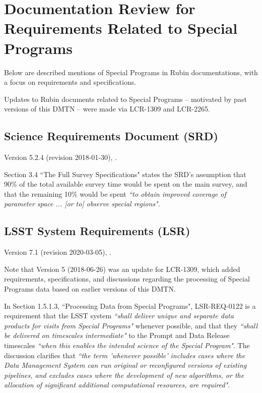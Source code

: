 \section{Documentation Review for Requirements Related to Special Programs}\label{sec:docrev}

Below are described mentions of Special Programs in Rubin documentations, with a focus on requirements and specifications.

Updates to Rubin documents related to Special Programs -- motivated by past versions of this DMTN -- were made via LCR-1309 and LCR-2265. 



\subsection{Science Requirements Document (SRD)}

Version 5.2.4 (revision 2018-01-30), .

Section 3.4 ``The Full Survey Specifications" states the SRD's assumption that 90\% of the total available survey time would be spent on the main survey, and that the remaining 10\% would be spent {\it ``to obtain improved coverage of parameter space ... [or to] observe special regions"}.



\subsection{LSST System Requirements (LSR)}

Version 7.1 (revision 2020-03-05), .

Note that Version 5 (2018-06-26) was an update for LCR-1309, which added requirements, specifications, and discussions regarding the processing of Special Programs data based on earlier versions of this DMTN.

In Section 1.5.1.3, ``Processing Data from Special Programs", LSR-REQ-0122 is a requirement that the LSST system {\it ``shall deliver unique and separate data products for visits from Special Programs"} whenever possible, and that they {\it ``shall be delivered on timescales intermediate"} to the Prompt and Data Release timescales {\it ``when this enables the intended science of the Special Program"}.
The discussion clarifies that {\it ``the term 'whenever possible' includes cases where the Data Management System can run original or reconfigured versions of existing pipelines, and excludes cases where the development of new algorithms, or the allocation of significant additional computational resources, are required"}.

